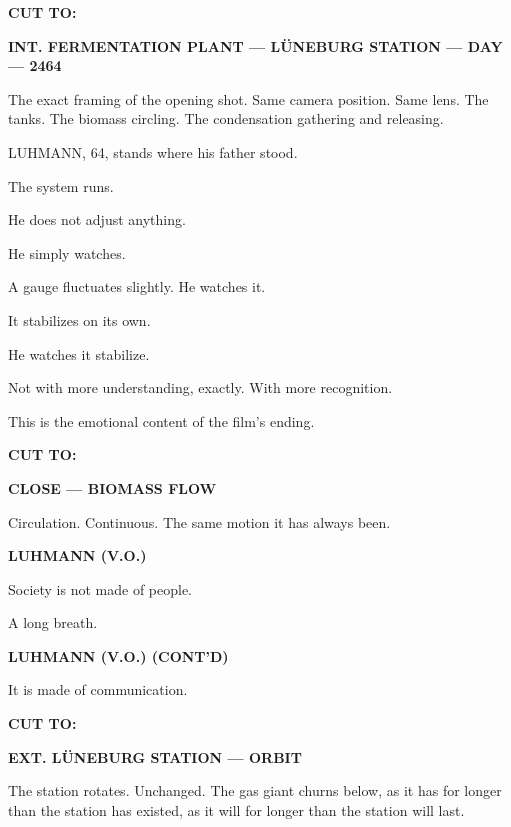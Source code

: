\documentclass[12pt]{article}
\newcommand{\sceneheading}[1]{%
  \vspace{10pt}%
  \noindent\textbf{#1}%
  \vspace{6pt}%
}
\newcommand{\trans}[1]{%
  \vspace{8pt}%
  \begin{flushright}\textbf{#1}\end{flushright}%
  \vspace{4pt}%
}
\newcommand{\character}[1]{%
  \vspace{8pt}%
  \begin{center}\textbf{#1}\end{center}%
  \vspace{-4pt}%
}
\newenvironment{dialogue}{%
  \begin{center}%
  \begin{minipage}{0.62\textwidth}%
}{%
  \end{minipage}%
  \end{center}%
  \vspace{4pt}%
}
\newenvironment{action}{%
  \vspace{4pt}%
  \noindent\ignorespaces%
}{%
  \vspace{6pt}%
}
\begin{document}
\trans{CUT TO:}

\sceneheading{INT. FERMENTATION PLANT — LÜNEBURG STATION — DAY — 2464}

\begin{action}
The exact framing of the opening shot. Same camera position. Same lens. The tanks. The biomass circling. The condensation gathering and releasing.

\medskip

LUHMANN, 64, stands where his father stood.

\medskip

The system runs.

\medskip

He does not adjust anything.

He simply watches.

\medskip

A gauge fluctuates slightly. He watches it.

It stabilizes on its own.

\medskip

He watches it stabilize.

\medskip

Not with more understanding, exactly. With more recognition.

\medskip

This is the emotional content of the film's ending.
\end{action}

\trans{CUT TO:}

\sceneheading{CLOSE — BIOMASS FLOW}

\begin{action}
Circulation. Continuous. The same motion it has always been.
\end{action}

\character{LUHMANN (V.O.)}
\begin{dialogue}
Society is not made of people.
\end{dialogue}

\begin{action}
A long breath.
\end{action}

\character{LUHMANN (V.O.) (CONT'D)}
\begin{dialogue}
It is made of communication.
\end{dialogue}

\trans{CUT TO:}

\sceneheading{EXT. LÜNEBURG STATION — ORBIT}

\begin{action}
The station rotates. Unchanged. The gas giant churns below, as it has for longer than the station has existed, as it will for longer than the station will last.
\end{action}
\end{document}

